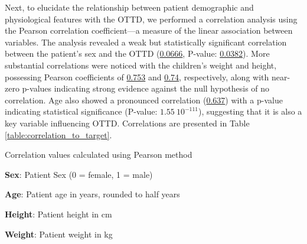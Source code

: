 \documentclass[11pt]{article}
\begin{document}
Next, to elucidate the relationship between patient demographic and physiological features with the OTTD, we performed a correlation analysis using the Pearson correlation coefficient—a measure of the linear association between variables. The analysis revealed a weak but statistically significant correlation between the patient's sex and the OTTD (\hyperlink{B0a}{0.0666}, P-value: \hyperlink{B0b}{0.0382}). More substantial correlations were noticed with the children’s weight and height, possessing Pearson coefficients of \hyperlink{B3a}{0.753} and \hyperlink{B2a}{0.74}, respectively, along with near-zero p-values indicating strong evidence against the null hypothesis of no correlation. Age also showed a pronounced correlation (\hyperlink{B1a}{0.637}) with a p-value indicating statistical significance (P-value: \hyperlink{B1b}{$1.55\ 10^{-111}$}), suggesting that it is also a key variable influencing OTTD. Correlations are presented in Table \ref{table:correlation_to_target}.

\begin{table}[h]
\caption{\protect\hyperlink{file-table-2-pkl}{Correlation between variables and the target variable}}
\label{table:correlation_to_target}
\begin{threeparttable}
\renewcommand{\TPTminimum}{\linewidth}
\begin{tablenotes}
\footnotesize
\item Correlation values calculated using Pearson method
\item \textbf{Sex}: Patient Sex (0 = female, 1 = male)
\item \textbf{Age}: Patient age in years, rounded to half years
\item \textbf{Height}: Patient height in cm
\item \textbf{Weight}: Patient weight in kg
\end{tablenotes}
\end{threeparttable}
\end{table}
\end{document}
